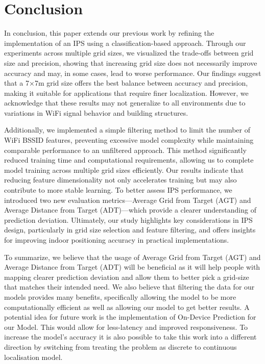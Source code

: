 \documentclass[conference]{IEEEtran}
\begin{document}
	
	
	
	\section{Conclusion}
	In conclusion, this paper extends our previous work by refining the implementation of an IPS using a classification-based approach. Through our experiments across multiple grid sizes, we visualized the trade-offs between grid size and precision, showing that increasing grid size does not necessarily improve accuracy and may, in some cases, lead to worse performance. Our findings suggest that a 7×7m grid size offers the best balance between accuracy and precision, making it suitable for applications that require finer localization. However, we acknowledge that these results may not generalize to all environments due to variations in WiFi signal behavior and building structures.
	
	Additionally, we implemented a simple filtering method to limit the number of WiFi BSSID features, preventing excessive model complexity while maintaining comparable performance to an unfiltered approach. This method significantly reduced training time and computational requirements, allowing us to complete model training across multiple grid sizes efficiently. Our results indicate that reducing feature dimensionality not only accelerates training but may also contribute to more stable learning. To better assess IPS performance, we introduced two new evaluation metrics—Average Grid from Target (AGT) and Average Distance from Target (ADT)—which provide a clearer understanding of prediction deviation. Ultimately, our study highlights key considerations in IPS design, particularly in grid size selection and feature filtering, and offers insights for improving indoor positioning accuracy in practical implementations.
	
	To summarize, we believe that the usage of Average Grid from Target (AGT)
	and Average Distance from Target (ADT) will be beneficial as it will help people with mapping clearer prediction deviation and allow them to better pick a grid-size that matches their intended need. We also believe that filtering the data for our models provides many benefits, specifically allowing the model to be more computationally efficient as well as allowing our model to get better results. A potential idea for future work is the implementation of On-Device Prediction for our Model. This would allow for less-latency and improved responsiveness. To increase the model’s accuracy it is also possible to take this work into a different direction by switching from treating the problem as discrete to continuous localisation model.
	
\end{document}
